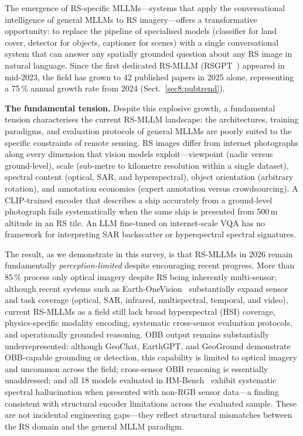 The emergence of RS-specific MLLMs---systems that apply the conversational
intelligence of general MLLMs to RS imagery---offers a transformative opportunity:
to replace the pipeline of specialised models (classifier for land cover, detector
for objects, captioner for scenes) with a single conversational system that can
answer any spatially grounded question about any RS image in natural language. Since
the first dedicated RS-MLLM (RSGPT~\cite{rsgpt2023}) appeared in mid-2023, the
field has grown to 42 published papers in 2025 alone, representing a 75\,\% annual
growth rate from 2024 (Sect.~\ref{sec8:pubtrend}).

\textbf{The fundamental tension.}
Despite this explosive growth, a fundamental tension characterises the current
RS-MLLM landscape: the architectures, training paradigms, and evaluation protocols
of general MLLMs are poorly suited to the specific constraints of remote sensing.
RS images differ from internet photographs along every dimension that vision models
exploit---viewpoint (nadir versus ground-level), scale (sub-metre to kilometre
resolution within a single dataset), spectral content (optical, SAR, and
hyperspectral), object orientation (arbitrary rotation), and annotation economics
(expert annotation versus crowdsourcing). A CLIP-trained encoder that describes a
ship accurately from a ground-level photograph fails systematically when the same
ship is presented from 500\,m altitude in an RS tile. An LLM fine-tuned on
internet-scale VQA has no framework for interpreting SAR backscatter or
hyperspectral spectral signatures.

The result, as we demonstrate in this survey, is that RS-MLLMs in 2026 remain
fundamentally \emph{perception-limited} despite encouraging recent progress.
More than 85\,\% process only optical imagery despite RS being
inherently multi-sensor; although recent systems such as
Earth-OneVision~\cite{earthonevision2026} substantially expand sensor and task
coverage (optical, SAR, infrared, multispectral, temporal, and video), current
RS-MLLMs as a field still lack broad hyperspectral (HSI) coverage,
physics-specific modality encoding, systematic cross-sensor evaluation protocols,
and operationally grounded reasoning. OBB output remains substantially underrepresented: although GeoChat, EarthGPT,
and GeoGround demonstrate OBB-capable grounding or detection, this capability is
limited to optical imagery and uncommon across the field; cross-sensor OBB
reasoning is essentially unaddressed; and all 18 models
evaluated in HM-Bench~\cite{hmbench2026} exhibit systematic spectral hallucination when
presented with non-RGB sensor data---a finding consistent with structural encoder limitations
across the evaluated sample. These are not incidental engineering gaps---they reflect
structural mismatches between the RS domain and the general MLLM paradigm.

